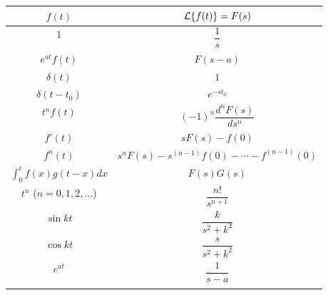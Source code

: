 \documentclass[a4paper, 10pt, ]{article}
\begin{document}
    \begin{longtable}{cc}

        \toprule
        $f(t)$                                  & $\mathcal{L}{\left\{f(t)\right\}}=F(s)$ \\
        \midrule
        \endhead
        \addlinespace[3mm]
        $1$                                     &    			  $\dfrac{1}{s}$                        \\ \addlinespace[3mm]
        $e^{at}f(t)$	                        & $F(s-a)$	                                            \\ \addlinespace[3mm]
        $\delta(t)$	                            & $1$                                                   \\ \addlinespace[3mm]
        $\delta(t-t_0)$                         & $e^{-st_0}$                                           \\ \addlinespace[3mm]
        $t^nf(t)$ 	                            & $(-1)^n\dfrac{d^nF(s)}{ds^n}$                          \\ \addlinespace[3mm]
        $f'(t)$ 	                            & $sF(s) - f(0)$                                       \\ \addlinespace[3mm]
        $f^{n}(t)$ 	                            & $s^nF(s) - s^{(n-1)} f(0) - \cdots - f^{(n-1)}(0)$    \\ \addlinespace[3mm]
        $\displaystyle{\int_0^t f(x)g(t-x)dx}$  & $F(s)G(s)$                                            \\ \addlinespace[3mm]
        $t^n$ ($n=0,1,2,\dots$)                 & $\dfrac{n!}{s^{n+1}}$                                 \\ \addlinespace[3mm]
        $\sin kt$ 	                            & $\dfrac{k}{s^2+k^2}$                                   \\ \addlinespace[3mm]
        $\cos kt$ 	                            & $\dfrac{s}{s^2+k^2}$                                   \\ \addlinespace[3mm]
        $e^{at}$ 	                            & $\dfrac{1}{s-a}$ 	                                      \\ \addlinespace[3mm]

\end{longtable}
\end{document}
